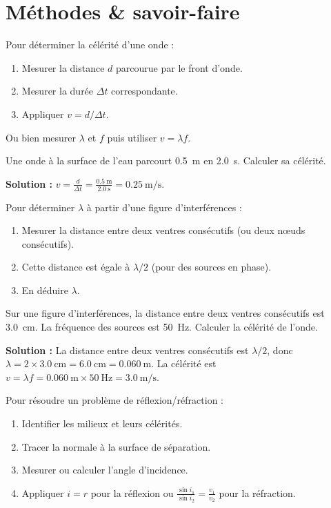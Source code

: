 \section{Méthodes \& savoir-faire}

Pour déterminer la célérité d'une onde :
\begin{enumerate}
    \item Mesurer la distance $d$ parcourue par le front d'onde.
    \item Mesurer la durée $\Delta t$ correspondante.
    \item Appliquer $v = d/\Delta t$.
\end{enumerate}
Ou bien mesurer $\lambda$ et $f$ puis utiliser $v = \lambda f$.

\begin{exemple}
Une onde à la surface de l'eau parcourt \SI{0.5}{\metre} en \SI{2.0}{\second}. Calculer sa célérité.
\medskip

\textbf{Solution :} $v = \frac{d}{\Delta t} = \frac{\SI{0.5}{\metre}}{\SI{2.0}{\second}} = \SI{0.25}{\metre\per\second}$.
\end{exemple}

Pour déterminer $\lambda$ à partir d'une figure d'interférences :
\begin{enumerate}
    \item Mesurer la distance entre deux ventres consécutifs (ou deux nœuds consécutifs).
    \item Cette distance est égale à $\lambda/2$ (pour des sources en phase).
    \item En déduire $\lambda$.
\end{enumerate}

\begin{exemple}
Sur une figure d'interférences, la distance entre deux ventres consécutifs est \SI{3.0}{\centi\metre}. La fréquence des sources est \SI{50}{\hertz}. Calculer la célérité de l'onde.
\medskip

\textbf{Solution :} La distance entre deux ventres consécutifs est $\lambda/2$, donc $\lambda = 2 \times \SI{3.0}{\centi\metre} = \SI{6.0}{\centi\metre} = \SI{0.060}{\metre}$. La célérité est $v = \lambda f = \SI{0.060}{\metre} \times \SI{50}{\hertz} = \SI{3.0}{\metre\per\second}$.
\end{exemple}

Pour résoudre un problème de réflexion/réfraction :
\begin{enumerate}
    \item Identifier les milieux et leurs célérités.
    \item Tracer la normale à la surface de séparation.
    \item Mesurer ou calculer l'angle d'incidence.
    \item Appliquer $i = r$ pour la réflexion ou $\frac{\sin i_1}{\sin i_2} = \frac{v_1}{v_2}$ pour la réfraction.
\end{enumerate}

